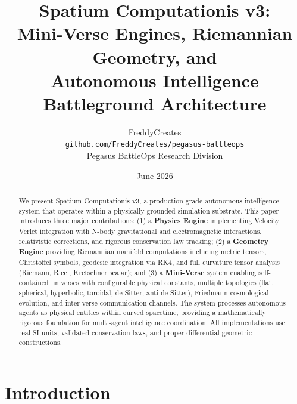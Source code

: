 \documentclass[12pt, a4paper]{article}
\begin{document}
\title{%
    \textbf{Spatium Computationis v3:} \\
    \Large Mini-Verse Engines, Riemannian Geometry, and \\
    Autonomous Intelligence Battleground Architecture
}

\author{
    FreddyCreates \\
    \texttt{github.com/FreddyCreates/pegasus-battleops} \\
    \vspace{0.5em}
    \small Pegasus BattleOps Research Division
}

\date{June 2026}

\maketitle

\begin{abstract}
We present Spatium Computationis v3, a production-grade autonomous intelligence
system that operates within a physically-grounded simulation substrate. This paper
introduces three major contributions: (1) a \textbf{Physics Engine} implementing
Velocity Verlet integration with N-body gravitational and electromagnetic
interactions, relativistic corrections, and rigorous conservation law tracking;
(2) a \textbf{Geometry Engine} providing Riemannian manifold computations including
metric tensors, Christoffel symbols, geodesic integration via RK4, and full
curvature tensor analysis (Riemann, Ricci, Kretschner scalar); and (3) a
\textbf{Mini-Verse} system enabling self-contained universes with configurable
physical constants, multiple topologies (flat, spherical, hyperbolic, toroidal,
de Sitter, anti-de Sitter), Friedmann cosmological evolution, and inter-verse
communication channels. The system processes autonomous agents as physical entities
within curved spacetime, providing a mathematically rigorous foundation for
multi-agent intelligence coordination. All implementations use real SI units,
validated conservation laws, and proper differential geometric constructions.
\end{abstract}

\tableofcontents
\newpage

\section{Introduction}
\label{sec:intro}
\end{document}
